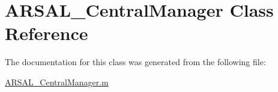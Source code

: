 \hypertarget{classARSAL__CentralManager}{}\section{A\+R\+S\+A\+L\+\_\+\+Central\+Manager Class Reference}
\label{classARSAL__CentralManager}


The documentation for this class was generated from the following file\+:\begin{DoxyCompactItemize}
\item 
\hyperlink{ARSAL__CentralManager_8m}{A\+R\+S\+A\+L\+\_\+\+Central\+Manager.\+m}\end{DoxyCompactItemize}

